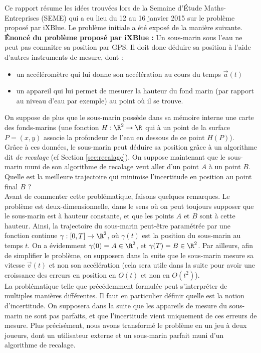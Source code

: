 

Ce rapport résume les idées trouvées lors de la Semaine d'\'Etude Maths-Entreprises (SEME) qui a eu lieu du 12 au 16 janvier 2015 sur le problème proposé par iXBlue. Le problème initiale a été exposé de la manière suivante.\\
\textbf{\'Enoncé du problème proposé par iXBlue :} Un sous-marin sous l'eau ne peut pas connaitre sa position par GPS. Il doit donc déduire sa position à l'aide d'autres instruments de mesure, dont :
\begin{itemize}
	\item un accéléromètre qui lui donne son accélération au cours du temps $\vec{a}(t)$
	\item un appareil qui lui permet de mesurer la hauteur du fond marin (par rapport au niveau d'eau par exemple) au point où il se trouve.
\end{itemize}
On suppose de plus que le sous-marin possède dans sa mémoire interne une carte des fonds-marins (une fonction $H : \R^2 \to \R$ qui à un point de la surface $P = (x,y)$ associe la profondeur de l'eau en dessous de ce point $H(P)$). \\
Grâce à ces données, le sous-marin peut déduire sa position grâce à un algorithme dit \textit{de recalage} (cf Section \ref{sec:recalage}). On suppose maintenant que le sous-marin muni de son algorithme de recalage veut aller d'un point $A$ à un point $B$. Quelle est la meilleure trajectoire qui minimise l'incertitude en position au point final $B$ ? \\

Avant de commenter cette problématique, faisons quelques remarques. Le problème est deux-dimensionnelle, dans le sens où on peut toujours supposer que le sous-marin est à hauteur constante, et que les points $A$ et $B$ sont à cette hauteur. Ainsi, la trajectoire du sous-marin peut-être paramétrée par une fonction continue $\gamma : [0, T] \to \R^2$, où $\gamma(t)$ est la position du sous-marin au temps $t$. On a évidemment $\gamma(0) = A \in \R^2$, et $\gamma(T) = B \in \R^2$. Par ailleurs, afin de simplifier le problème, on supposera dans la suite que le sous-marin mesure sa vitesse $\vec{v}(t)$ et non son accélération (cela sera utile dans la suite pour avoir une croissance des erreurs en position en $O(t)$ et non en $O(t^2)$).\\

La problématique telle que précédemment formulée peut s'interpréter de multiples manières différentes. Il faut en particulier définir quelle est la notion d'incertitude. On supposera dans la suite que les appareils de mesure du sous-marin ne sont pas parfaits, et que l'incertitude vient uniquement de ces erreurs de mesure. Plus précisément, nous avons transformé le problème en un jeu à deux joueurs, dont un utilisateur externe et un sous-marin parfait muni d'un algorithme de recalage.\\

